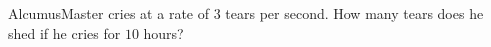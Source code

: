 AlcumusMaster cries at a rate of $3$ tears per second. How many tears does he shed if he cries for $10$ hours?
